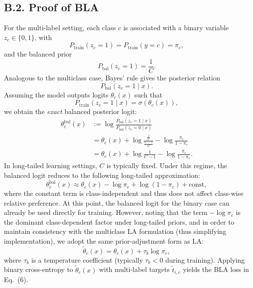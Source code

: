 \subsection*{B.2. Proof of BLA}
For the multi-label setting, each class $c$ is associated with a binary
variable $z_c\in\{0,1\}$, with
\[
P_{\text{train}}(z_c=1)=P_{\text{train}}(y=c)=\pi_c,
\]
and the balanced prior
\[
P_{\text{bal}}(z_c=1)=\frac{1}{C}.
\]
Analogous to the multiclass case, Bayes' rule gives the posterior relation
\[
P_{\text{bal}}(z_c=1 \mid x).
\]
Assuming the model outputs logits $\theta_c(x)$ such that
\[
P_{\text{train}}(z_c=1\mid x)=\sigma(\theta_c(x)),
\]
we obtain the \emph{exact} balanced posterior logit:
\[
\begin{aligned}
\theta_c^{\text{bal}}(x)
&:= \log\frac{P_{\text{bal}}(z_c=1\mid x)}{P_{\text{bal}}(z_c=0\mid x)}  \\
&= \theta_c(x)
+ \log\frac{\frac{1}{C}}{\frac{C-1}{C}}
- \log\frac{\pi_c}{1-\pi_c} \\
&= \theta_c(x)
+ \log\frac{1}{C-1}
- \log\frac{\pi_c}{1-\pi_c}.
\end{aligned}
\]
In long-tailed learning settings, $C$ is typically fixed. Under this regime, the balanced logit reduces to the
following long-tailed approximation:
\[
\theta_c^{\text{bal}}(x)
\approx 
\theta_c(x) - \log\pi_c + \log(1-\pi_c) + \text{const},
\]
where the constant term is class-independent and thus does not affect class-wise relative preference. At this point, the balanced logit for the binary case can already be used directly for training. 
However, noting that the term $-\log\pi_c$ is the dominant class-dependent factor under long-tailed 
priors, and in order to maintain consistency with the multiclass LA formulation (thus simplifying 
implementation), we adopt the same prior-adjustment form as LA:
\[
\tilde\theta_c(x)=\theta_c(x)+\tau_b\log\pi_c,
\]
where $\tau_b$ is a temperature coefficient (typically $\tau_b<0$ during training). Applying binary
cross-entropy to $\tilde\theta_c(x)$ with multi-label targets $\tilde t_{i,c}$ yields the BLA loss in
Eq.~(6).



